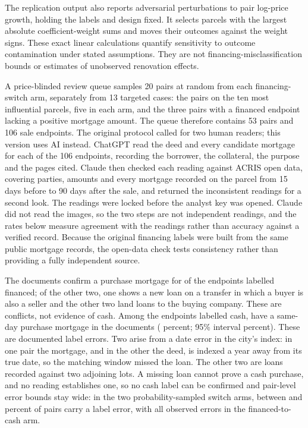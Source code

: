 \documentclass[12pt]{article}
\begin{document}
The replication output also reports adversarial perturbations to pair log-price growth, holding the labels and design fixed. It selects parcels with the largest absolute coefficient-weight sums and moves their outcomes against the weight signs. These exact linear calculations quantify sensitivity to outcome contamination under stated assumptions. They are not financing-misclassification bounds or estimates of unobserved renovation effects.

A price-blinded review queue samples 20 pairs at random from each financing-switch arm, separately from 13 targeted cases: the pairs on the ten most influential parcels, five in each arm, and the three pairs with a financed endpoint lacking a positive mortgage amount. The queue therefore contains 53 pairs and 106 sale endpoints. The original protocol called for two human readers; this version uses AI instead. ChatGPT read the deed and every candidate mortgage for each of the 106 endpoints, recording the borrower, the collateral, the purpose and the pages cited. Claude then checked each reading against ACRIS open data, covering parties, amounts and every mortgage recorded on the parcel from 15 days before to 90 days after the sale, and returned the inconsistent readings for a second look. The readings were locked before the analyst key was opened. Claude did not read the images, so the two steps are not independent readings, and the rates below measure agreement with the readings rather than accuracy against a verified record. Because the original financing labels were built from the same public mortgage records, the open-data check tests consistency rather than providing a fully independent source.

The documents confirm a purchase mortgage for \ReviewFinConfirmed{} of the \ReviewFinTotal{} endpoints labelled financed; of the other two, one shows a new loan on a transfer in which a buyer is also a seller and the other two land loans to the buying company. These are conflicts, not evidence of cash. Among the \ReviewCashTotal{} endpoints labelled cash, \ReviewCashMtg{} have a same-day purchase mortgage in the documents (\ReviewCashShare{} percent; 95\% interval \ReviewCashCI{} percent). These are documented label errors. Two arise from a date error in the city's index: in one pair the mortgage, and in the other the deed, is indexed a year away from its true date, so the matching window missed the loan. The other two are loans recorded against two adjoining lots. A missing loan cannot prove a cash purchase, and no reading establishes one, so no cash label can be confirmed and pair-level error bounds stay wide: in the two probability-sampled switch arms, between \ReviewPairLow{} and \ReviewPairHigh{} percent of pairs carry a label error, with all \ReviewArmErrors{} observed errors in the financed-to-cash arm.
\end{document}
